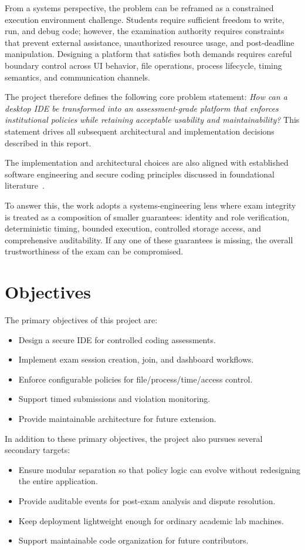 \documentclass[12pt,a4paper]{report}
\begin{document}
	From a systems perspective, the problem can be reframed as a constrained execution environment challenge. Students require sufficient freedom to write, run, and debug code; however, the examination authority requires constraints that prevent external assistance, unauthorized resource usage, and post-deadline manipulation. Designing a platform that satisfies both demands requires careful boundary control across UI behavior, file operations, process lifecycle, timing semantics, and communication channels.
	
	The project therefore defines the following core problem statement: \textit{How can a desktop IDE be transformed into an assessment-grade platform that enforces institutional policies while retaining acceptable usability and maintainability?} This statement drives all subsequent architectural and implementation decisions described in this report.
	
	The implementation and architectural choices are also aligned with established software engineering and secure coding principles discussed in foundational literature~\cite{sommerville,securecode}.
	
	To answer this, the work adopts a systems-engineering lens where exam integrity is treated as a composition of smaller guarantees: identity and role verification, deterministic timing, bounded execution, controlled storage access, and comprehensive auditability. If any one of these guarantees is missing, the overall trustworthiness of the exam can be compromised.
	
	\section{Objectives}
	The primary objectives of this project are:
	\begin{itemize}
		\item Design a secure IDE for controlled coding assessments.
		\item Implement exam session creation, join, and dashboard workflows.
		\item Enforce configurable policies for file/process/time/access control.
		\item Support timed submissions and violation monitoring.
		\item Provide maintainable architecture for future extension.
	\end{itemize}
	
	In addition to these primary objectives, the project also pursues several secondary targets:
	\begin{itemize}
		\item Ensure modular separation so that policy logic can evolve without redesigning the entire application.
		\item Provide auditable events for post-exam analysis and dispute resolution.
		\item Keep deployment lightweight enough for ordinary academic lab machines.
		\item Support maintainable code organization for future contributors.
	\end{itemize}
	
\end{document}
